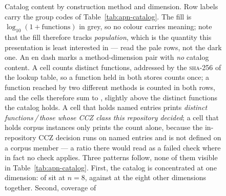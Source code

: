 \begin{figure}[tp]
  \centering
  \caption{Catalog content by construction method and dimension.  Row labels
    carry the group codes of Table~\ref{tab:apn-catalog}.  The fill is
    $\log_{10}(1+\text{functions})$ in grey, so no colour carries meaning; note
    that the fill therefore tracks \emph{population}, which is the quantity
    this presentation is least interested in --- read the pale rows, not the
    dark one.  An en dash marks a method-dimension pair with \emph{no} catalog
    content.  A cell counts distinct functions, addressed by the
    \textsc{sha}-256 of the lookup table, so a function held in both stores
    counts once; a function reached by two different methods is counted in both
    rows, and the cells therefore sum to \apnCellTotal{}, slightly above the
    \apnDistinct{} distinct functions the catalog holds.  A cell that holds
    named entries prints \emph{distinct functions\,/\,those whose CCZ class
    this repository decided}; a cell that holds corpus instances only prints
    the count alone, because the in-repository CCZ decision runs on named
    entries and is not defined on a corpus member --- a ratio there would read
    as a failed check where in fact no check applies.
    Three patterns follow, none of them visible in
    Table~\ref{tab:apn-catalog}.  First, the catalog is concentrated at one
    dimension: \apnNEIGHT{} of \apnCellTotal{} sit at $n=8$, against
    \apnNotEIGHT{} at the eight other dimensions together.  Second, coverage of
}
\end{figure}
